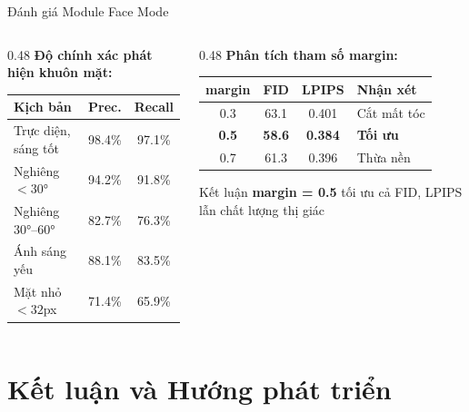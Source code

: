 \documentclass[aspectratio=169,12pt]{beamer}
\begin{document}
\begin{frame}{Đánh giá Module Face Mode}
\begin{columns}[T]
\begin{column}{0.48\textwidth}
\textbf{Độ chính xác phát hiện khuôn mặt:}
\vspace{0.1cm}

\small
\begin{tabular}{lcc}
\toprule
\textbf{Kịch bản} & \textbf{Prec.} & \textbf{Recall} \\
\midrule
Trực diện, sáng tốt & 98.4\% & 97.1\% \\
Nghiêng $<30°$ & 94.2\% & 91.8\% \\
Nghiêng $30°$--$60°$ & 82.7\% & 76.3\% \\
Ánh sáng yếu & 88.1\% & 83.5\% \\
Mặt nhỏ $<32$px & 71.4\% & 65.9\% \\
\bottomrule
\end{tabular}
\end{column}
\begin{column}{0.48\textwidth}
\textbf{Phân tích tham số margin:}
\vspace{0.1cm}

\small
\begin{tabular}{cccl}
\toprule
\textbf{margin} & \textbf{FID} & \textbf{LPIPS} & \textbf{Nhận xét} \\
\midrule
0.3 & 63.1 & 0.401 & Cắt mất tóc \\
\rowcolor{lightblue} \textbf{0.5} & \textbf{58.6} & \textbf{0.384} & \textbf{Tối ưu} \\
0.7 & 61.3 & 0.396 & Thừa nền \\
\bottomrule
\end{tabular}

\vspace{0.3cm}
\begin{exampleblock}{Kết luận}
\small
\textbf{margin = 0.5} tối ưu cả FID, LPIPS lẫn chất lượng thị giác
\end{exampleblock}
\end{column}
\end{columns}
\end{frame}

\section{Kết luận và Hướng phát triển}
\end{document}
